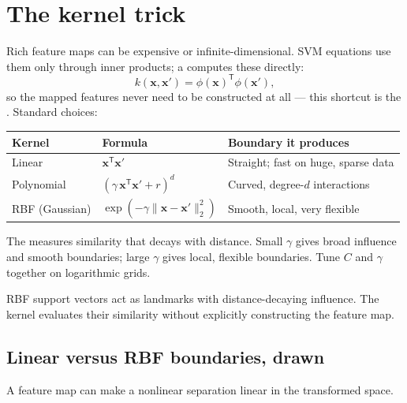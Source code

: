 \section{The kernel trick}

Rich feature maps can be expensive or infinite-dimensional. SVM equations use them only through inner products; a  computes these directly:
\[
  k(\bm{x},\bm{x}')=\phi(\bm{x})^{\mathsf T}\phi(\bm{x}'),
\]
so the mapped features never need to be constructed at all --- this shortcut is the . Standard choices:

\begin{mltable}
\begin{tabular}{@{}lll@{}}
\toprule
\rowcolor{MLPaleBlue!92}
Kernel & Formula & Boundary it produces \\
\midrule
Linear & $\bm{x}^{\mathsf T}\bm{x}'$ & Straight; fast on huge, sparse data \\
Polynomial & ${(\gamma\,\bm{x}^{\mathsf T}\bm{x}'+r)}^d$ & Curved, degree-$d$ interactions \\
RBF (Gaussian) & $\exp\!\left(-\gamma\|\bm{x}-\bm{x}'\|_2^2\right)$ & Smooth, local, very flexible \\
\bottomrule
\end{tabular}
\end{mltable}

The  measures similarity that decays with distance. Small $\gamma$ gives broad influence and smooth boundaries; large $\gamma$ gives local, flexible boundaries. Tune $C$ and $\gamma$ together on logarithmic grids.

\begin{intuition}
RBF support vectors act as landmarks with distance-decaying influence. The kernel evaluates their similarity without explicitly constructing the feature map.
\end{intuition}

\subsection{Linear versus RBF boundaries, drawn}

A feature map can make a nonlinear separation linear in the transformed space.

